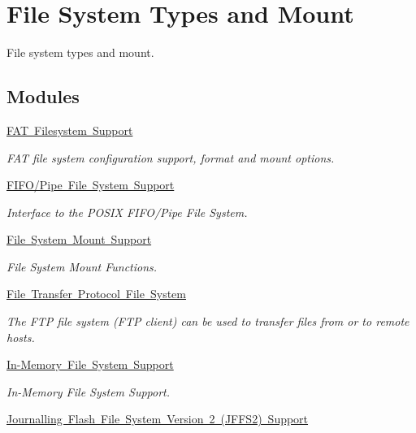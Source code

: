 \hypertarget{group__FileSystemTypesAndMount}{}\section{File System Types and Mount}
\label{group__FileSystemTypesAndMount}


File system types and mount.  


\subsection*{Modules}
\begin{DoxyCompactItemize}
\item 
\mbox{\hyperlink{group__DOSFS}{F\+A\+T Filesystem Support}}
\begin{DoxyCompactList}\small\item\em F\+AT file system configuration support, format and mount options. \end{DoxyCompactList}\item 
\mbox{\hyperlink{group__FIFO__PIPE}{F\+I\+F\+O/\+Pipe File System Support}}
\begin{DoxyCompactList}\small\item\em Interface to the P\+O\+S\+IX F\+I\+F\+O/\+Pipe File System. \end{DoxyCompactList}\item 
\mbox{\hyperlink{group__rtems__fstab}{File System Mount Support}}
\begin{DoxyCompactList}\small\item\em File System Mount Functions. \end{DoxyCompactList}\item 
\mbox{\hyperlink{group__rtems__ftpfs}{File Transfer Protocol File System}}
\begin{DoxyCompactList}\small\item\em The F\+TP file system (F\+TP client) can be used to transfer files from or to remote hosts. \end{DoxyCompactList}\item 
\mbox{\hyperlink{group__IMFS}{In-\/\+Memory File System Support}}
\begin{DoxyCompactList}\small\item\em In-\/\+Memory File System Support. \end{DoxyCompactList}\item 
\mbox{\hyperlink{group__JFFS2}{Journalling Flash File System Version 2 (\+J\+F\+F\+S2) Support}}

\end{DoxyCompactItemize}
